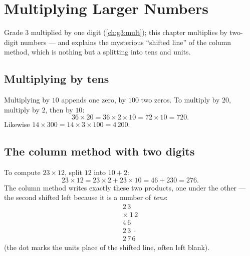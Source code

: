\chapter{Multiplying Larger Numbers}\label{ch:g4:mult}

Grade 3 multiplied by one digit (\cref{ch:g3:mult}); this chapter
multiplies by two-digit numbers --- and explains the mysterious
``shifted line'' of the column method, which is nothing but a
splitting into tens and units.

\section{Multiplying by tens}

\begin{proposition}\label{prop:g4:mult:tens}
Multiplying by $10$ appends one zero, by $100$ two zeros. To multiply
by $20$, multiply by $2$, then by $10$:
\[
36 \times 20 = 36 \times 2 \times 10 = 72 \times 10 = 720 .
\]
Likewise $14 \times 300 = 14 \times 3 \times 100 = 4\,200$.
\end{proposition}
\admitted

\section{The column method with two digits}

\begin{example}\label{ex:g4:mult:why}
To compute $23 \times 12$, split $12$ into $10 + 2$:
\[
23 \times 12 = 23 \times 2 + 23 \times 10 = 46 + 230 = 276 .
\]
The column method writes exactly these two products, one under the
other --- the second shifted left because it is a number of
\emph{tens}:
\[
\begin{array}{r}
2\,3 \\
\times\ 1\,2 \\
\hline
4\,6 \\
2\,3\,\cdot \\
\hline
2\,7\,6
\end{array}
\]
(the dot marks the units place of the shifted line, often left
blank).
\end{example}

